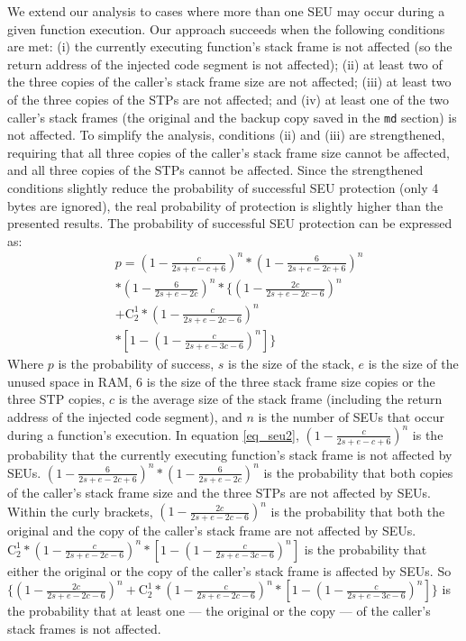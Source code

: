 We extend our analysis to cases where more than one SEU may occur during a given function execution. Our approach succeeds when the following conditions are met: (i) the currently executing function's stack frame is not affected (so the return address of the injected code segment is not affected); (ii) at least two of the three copies of the caller's stack frame size are not affected; (iii) at least two of the three copies of the STPs are not affected; and (iv) at least one of the two caller's stack frames (the original and the backup copy saved in the \texttt{md} section) is not affected. To simplify the analysis, conditions (ii) and (iii) are strengthened, requiring that all three copies of the caller's stack frame size cannot be affected, and all three copies of the STPs cannot be affected. Since the strengthened conditions slightly reduce the probability of successful SEU protection (only 4 bytes are ignored), the real probability of protection is slightly higher than the presented results. The probability of successful SEU protection can be expressed as:
\begin{equation}\label{eq_seu2}
\begin{split}
&p=(1-\frac{c}{2s+e-c+6})^n*(1-\frac{6}{2s+e-2c+6})^n \\
&*(1-\frac{6}{2s+e-2c})^n*\{(1-\frac{2c}{2s+e-2c-6})^n \\
&+ \mathrm{C}_2^1*(1-\frac{c}{2s+e-2c-6})^n\\
&*[1-(1-\frac{c}{2s+e-3c-6})^n]\}
\end{split}
\end{equation}
Where $p$ is the probability of success, $s$ is the size of the stack, $e$ is the size of the unused space in RAM, $6$ is the size of the three stack frame size copies or the three STP copies, $c$ is the average size of the stack frame (including the return address of the injected code segment), and $n$ is the number of SEUs that occur during a function's execution. In equation \ref{eq_seu2}, $(1-\frac{c}{2s+e-c+6})^n$ is the probability that the currently executing function's stack frame is not affected by SEUs. $(1-\frac{6}{2s+e-2c+6})^n*(1-\frac{6}{2s+e-2c})^n$ is the probability that both copies of the caller's stack frame size and the three STPs are not affected by SEUs. Within the curly brackets, $(1-\frac{2c}{2s+e-2c-6})^n$ is the probability that both the original and the copy of the caller's stack frame are not affected by SEUs. $\mathrm{C}_2^1*(1-\frac{c}{2s+e-2c-6})^n*[1-(1-\frac{c}{2s+e-3c-6})^n]$ is the probability that either the original or the copy of the caller's stack frame is affected by SEUs. So $\{(1-\frac{2c}{2s+e-2c-6})^n + \mathrm{C}_2^1*(1-\frac{c}{2s+e-2c-6})^n*[1-(1-\frac{c}{2s+e-3c-6})^n]\}$ is the probability that at least one --- the original or the copy --- of the caller's stack frames is not affected.

